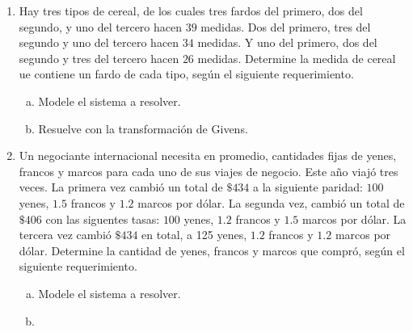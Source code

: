 \documentclass[
  spanish,
  8pt,
  utf8,
  xcolor=table,
  handout,
  aspectratio=169,
  professionalfonts,
  notheorems,
  mathserif,
]{beamer}
\newcounter{savedenum}
\newcommand*{\resume}{\setcounter{enumi}{\thesavedenum}}
\begin{document}
\begin{frame}
	\begin{enumerate}
		\resume

		\item

		      Hay tres tipos de cereal, de los cuales tres fardos del
		      primero, dos del segundo, y uno del tercero hacen $39$
		      medidas.
		      Dos del primero, tres del segundo y uno del tercero hacen
		      $34$ medidas.
		      Y uno del primero, dos del segundo y tres del tercero hacen
		      $26$ medidas.
		      Determine la medida de cereal ue contiene un fardo de cada
		      tipo, según el siguiente requerimiento.


		      \begin{multicols}{2}
			      \begin{enumerate}[a)]
				      \item

				            Modele el sistema a resolver.

				      \item

				            Resuelve con la transformación de Givens.
			      \end{enumerate}
		      \end{multicols}

		\item

		      Un negociante internacional necesita en promedio,
		      cantidades fijas de yenes, francos y marcos para cada uno
		      de sus viajes de negocio.
		      Este año viajó tres veces.
		      La primera vez cambió un total de $\$434$ a la siguiente
		      paridad: $100$ yenes, $1.5$ francos y $1.2$ marcos por
		      dólar.
		      La segunda vez, cambió un total de $\$ 406$ con las
		      siguentes tasas: $100$ yenes, $1.2$ francos y $1.5$ marcos
		      por dólar.
		      La tercera vez cambió $\$ 434$ en total, a 125 yenes, $1.2$
		      francos y $1.2$ marcos por dólar.
		      Determine la cantidad de yenes, francos y marcos que
		      compró, según el siguiente requerimiento.


		      \begin{multicols}{2}
			      \begin{enumerate}[a)]
				      \item

				            Modele el sistema a resolver.

				      \item


\end{enumerate}
\end{multicols}
\end{enumerate}
\end{frame}
\end{document}
